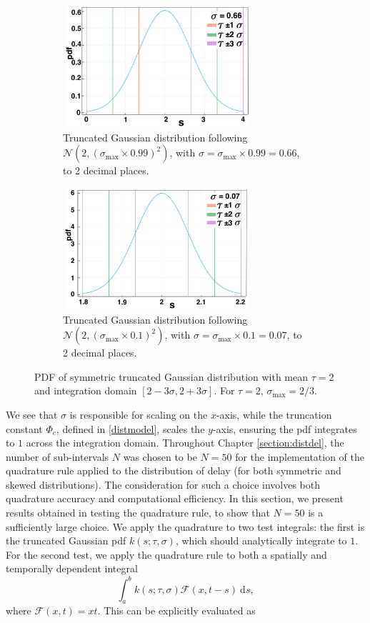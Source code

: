 \begin{figure}[H]
    \centering
    \begin{subfigure}[t]{0.45\textwidth}
        \centering
        \includegraphics[width=7cm,height=4.5cm]{t2sig1.png}
        \caption{Truncated Gaussian distribution following $\mathcal{N}(2,(\sigma_{\max}\times0.99)^2)$, with $\sigma=\sigma_{\max}\times0.99=0.66$, to 2 decimal places.}
        \label{}
    \end{subfigure}
    \hfill
    \begin{subfigure}[t]{0.45\textwidth}
        \centering
        \includegraphics[width=7cm,height=4.5cm]{t2sig2.png}
        \caption{Truncated Gaussian distribution following $\mathcal{N}(2,(\sigma_{\max}\times0.1)^2)$, with $\sigma=\sigma_{\max}\times0.1=0.07 $, to 2 decimal places.}
        \label{}
    \end{subfigure}
    \caption{PDF of symmetric truncated Gaussian distribution with mean $\tau=2$ and integration domain $[2-3\sigma,2+3\sigma]$. For $\tau=2$, $\sigma_{\max}=2/3$.}
    \label{fig:pdf2}
\end{figure}
We see that $\sigma$ is responsible for scaling on the $x$-axis, while the truncation constant $\Phi_c$, defined in \eqref{distmodel}, scales the $y$-axis, ensuring the pdf integrates to $1$ across the integration domain. Throughout Chapter \ref{section:distdel}, the number of sub-intervals $N$ was chosen to be $N=50$ for the implementation of the quadrature rule applied to the distribution of delay (for both symmetric and skewed distributions). The consideration for such a choice involves both quadrature accuracy and computational efficiency. In this section, we present results obtained in testing the quadrature rule, to show that $N=50$ is a sufficiently large choice. We apply the quadrature to two test integrals: the first is the truncated Gaussian pdf $k(s;\tau,\sigma)$, which should analytically integrate to $1$. For the second test, we apply the quadrature rule to both a spatially and temporally dependent integral
\begin{equation}\label{testint}
\int_a^bk(s;\tau,\sigma)\mathcal{F}(x,t-s)\ \text{d}s,
\end{equation}
where $\mathcal{F}(x,t)=xt$. This can be explicitly evaluated as

